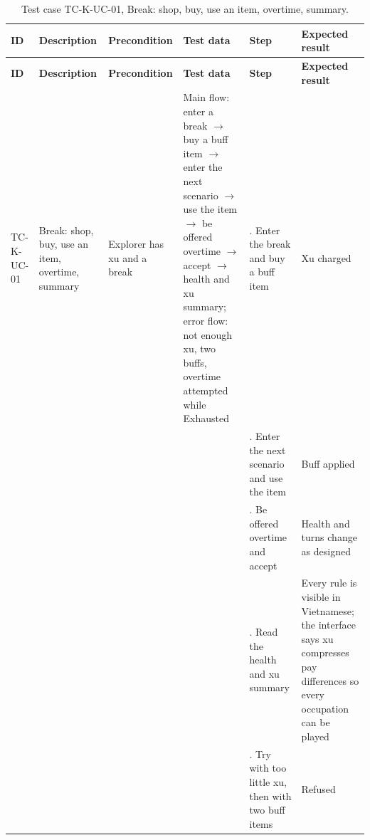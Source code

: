 {\footnotesize{}\renewcommand{\arraystretch}{1.1}
\begin{longtable}{|>{\raggedright\arraybackslash}p{}|>{\raggedright\arraybackslash}p{}|>{\raggedright\arraybackslash}p{}|>{\raggedright\arraybackslash}p{}|>{\raggedright\arraybackslash}p{}|>{\raggedright\arraybackslash}p{}|}
\caption{Test case TC-K-UC-01, Break: shop, buy, use an item, overtime, summary.} \\
\hline
\textbf{ID} & \textbf{Description} & \textbf{Precondition} & \textbf{Test data} & \textbf{Step} & \textbf{Expected result} \\ \hline
\endfirsthead
\hline
\textbf{ID} & \textbf{Description} & \textbf{Precondition} & \textbf{Test data} & \textbf{Step} & \textbf{Expected result} \\ \hline
\endhead
TC-K-UC-01 & Break: shop, buy, use an item, overtime, summary & Explorer has xu and a break & Main flow: enter a break $\rightarrow$ buy a buff item $\rightarrow$ enter the next scenario $\rightarrow$ use the item $\rightarrow$ be offered overtime $\rightarrow$ accept $\rightarrow$ health and xu summary; error flow: not enough xu, two buffs, overtime attempted while Exhausted & 1. Enter the break and buy a buff item & Xu charged \\ \cline{5-6}
 &  &  &  & 2. Enter the next scenario and use the item & Buff applied \\ \cline{5-6}
 &  &  &  & 3. Be offered overtime and accept & Health and turns change as designed \\ \cline{5-6}
 &  &  &  & 4. Read the health and xu summary & Every rule is visible in Vietnamese; the interface says xu compresses pay differences so every occupation can be played \\ \cline{5-6}
 &  &  &  & 5. Try with too little xu, then with two buff items & Refused \\ \hline
\end{longtable}
}

